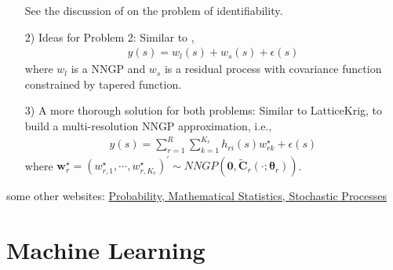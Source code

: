 \documentclass[
12pt, %
a4paper, %
oneside, %
headinclude,footinclude, %
BCOR5mm, %
]{scrartcl}
\begin{document}
\begin{itemize}
See the discussion of 
\href{https://chenyw68.github.io/Literature/[2013]identifiability)hierarchical factor models for large spatially misaligned data_ a low-rank predictive process approach.pdf}{\cite{ren2013hierarchical}} on the problem of identifiability.


 \item [2)] Ideas for Problem 2: Similar to \href{https://chenyw68.github.io/Literature/[2012]A full scale approximation of covariance functions for large spatial data sets.pdf}{\cite{sang2012full}},
\begin{equation}
    \begin{aligned}
       y(s) = w_l(s) + w_s(s) + \epsilon(s)
    \end{aligned} \label{DP1}
\end{equation}
where $w_l$ is a NNGP and $w_s$ is a residual process with covariance function constrained by tapered function.
 \item [3)] A more thorough solution for both problems: Similar to LatticeKrig, to build a multi-resolution NNGP approximation, i.e.,
 \begin{equation}
\begin{aligned}
y(s) = \sum_{r = 1}^{R}\sum_{k = 1}^{K_r}h_{ri}(s)w_{rk}^{\star}  + \epsilon(s)
\end{aligned} \label{DP1}
\end{equation}
where $\boldsymbol{w}_r^{\star} = \left(w_{r, 1}^{\star}, \cdots, w_{r, K_r}^{\star}\right)^\prime \sim NNGP\left(\boldsymbol{0}, \boldsymbol{\tilde{C}}_r(\cdot; \boldsymbol{\theta}_r)\right)$.
\end{itemize}


some other websites: \href{http://www.randomservices.org/random/index.html}{Probability, Mathematical Statistics, Stochastic Processes}


\section{Machine Learning}
\href{https://chenyw68.github.io/Literature[2020]spNNGP R package for Nearest Neighbor Gaussian Process models.pdf}{\citep{murphy2012machine}}

%

\end{document}
